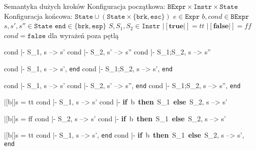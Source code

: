\documentclass[12pt]{minimal}
\begin{document}
{\Huge Semantyka dużych kroków}
\newline\newline
Konfiguracja początkowa: $\texttt{BExpr} \times \texttt{Instr} \times \texttt{State}$ \newline
Konfiguracja końcowa: $\texttt{State} \cup (\texttt{State} \times \{\texttt{brk}, \texttt{esc}\})$ \newline
\newline
$e \in \texttt{Expr}$ \newline
$b, cond \in \texttt{BExpr}$ \newline
$s, s', s'' \in \texttt{State}$ \newline
$\texttt{end} \in \{\texttt{brk}, \texttt{esp}\}$ \newline
$S, S_1, S_2 \in \texttt{Instr}$ \newline
$|[\textbf{true}|] = tt$ \newline
$|[\textbf{false}|] = ff$ \newline
\newline
$cond = \texttt{false}$ dla wyrażeń poza pętlą

\vspace{5mm}

\vspace{5mm}

\vspace{5mm}
\inference
{cond |- S_1, s --> s' \quad cond |- S_2, s' --> s''}
{cond |- S_1;S_2, s --> s''}

\vspace{5mm}
\inference
{cond |- S_1, s --> s', \texttt{end}}
{cond |- S_1;S_2, s --> s', \texttt{end}}

\vspace{5mm}
\inference
{cond |- S_1, s --> s' \quad cond |- S_2, s' --> s'', \texttt{end}}
{cond |- S_1;S_2, s --> s'', \texttt{end}}

\vspace{5mm}
\inference
{|[b|]s = tt \quad cond |- S_1, s --> s'}
{cond |- \textbf{if}~b~\textbf{then}~S_1~\textbf{else}~S_2, s --> s'}

\vspace{5mm}
\inference
{|[b|]s = ff \quad cond |- S_2, s --> s'}
{cond |- \textbf{if}~b~\textbf{then}~S_1~\textbf{else}~S_2, s --> s'}

\vspace{5mm}
\inference
{|[b|]s = tt \quad cond |- S_1, s --> s', \texttt{end}}
{cond |- \textbf{if}~b~\textbf{then}~S_1~\textbf{else}~S_2, s --> s', \texttt{end}}
\end{document}
